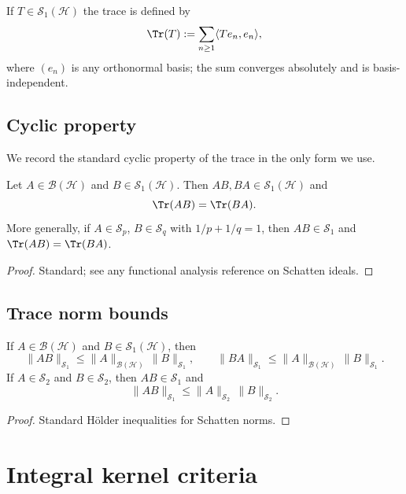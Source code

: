 If $T\in \mathcal{S}_1(\mathcal{H})$ the trace is defined by
\[
\Tr(T) := \sum_{n\ge 1} \langle Te_n,e_n\rangle,
\]
where $(e_n)$ is any orthonormal basis; the sum converges absolutely and is basis-independent.

\subsection{Cyclic property}
\label{subsec:L.cyclic}

We record the standard cyclic property of the trace in the only form we use.

\begin{lemma}
\label{lem:L.cyclic}
Let $A\in \mathcal{B}(\mathcal{H})$ and $B\in \mathcal{S}_1(\mathcal{H})$. Then $AB,BA\in \mathcal{S}_1(\mathcal{H})$
and
\[
\Tr(AB)=\Tr(BA).
\]
More generally, if $A\in\mathcal{S}_p$, $B\in\mathcal{S}_q$ with $1/p+1/q=1$, then $AB\in\mathcal{S}_1$ and
$\Tr(AB)=\Tr(BA)$.
\end{lemma}

\begin{proof}
Standard; see any functional analysis reference on Schatten ideals.
\end{proof}

\subsection{Trace norm bounds}
\label{subsec:L.tracebounds}

\begin{lemma}
\label{lem:L.idealbounds}
If $A\in\mathcal{B}(\mathcal{H})$ and $B\in\mathcal{S}_1(\mathcal{H})$, then
\[
\|AB\|_{\mathcal{S}_1} \le \|A\|_{\mathcal{B}(\mathcal{H})}\,\|B\|_{\mathcal{S}_1},
\qquad
\|BA\|_{\mathcal{S}_1} \le \|A\|_{\mathcal{B}(\mathcal{H})}\,\|B\|_{\mathcal{S}_1}.
\]
If $A\in\mathcal{S}_2$ and $B\in\mathcal{S}_2$, then $AB\in\mathcal{S}_1$ and
\[
\|AB\|_{\mathcal{S}_1}\le \|A\|_{\mathcal{S}_2}\,\|B\|_{\mathcal{S}_2}.
\]
\end{lemma}

\begin{proof}
Standard Hölder inequalities for Schatten norms.
\end{proof}

\section{Integral kernel criteria}
\label{sec:L.kernel}

